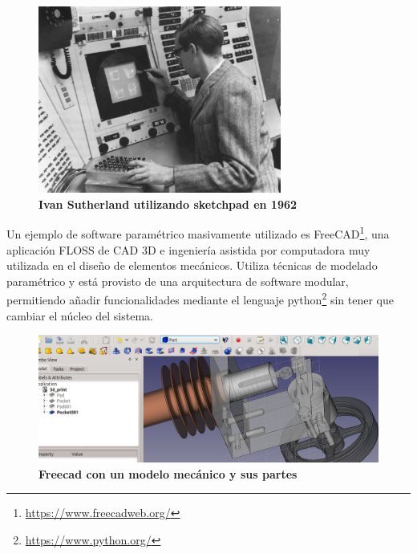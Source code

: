 \begin{figure}[h]
\includegraphics[width=8cm]{Img/GEO/geo-sketchpadc.jpg}
\centering
\caption{\textbf{\footnotesize{Ivan Sutherland utilizando sketchpad en 1962}}}
\end{figure}


Un ejemplo de software paramétrico masivamente utilizado es FreeCAD\footnote{\url{https://www.freecadweb.org/}}, una aplicación FLOSS de CAD 3D e ingeniería asistida por computadora muy utilizada en el diseño de elementos mecánicos. Utiliza técnicas de modelado paramétrico y está provisto de una arquitectura de software modular, permitiendo añadir funcionalidades mediante el lenguaje python\footnote{\url{https://www.python.org/}} sin tener que cambiar el núcleo del sistema.

\begin{figure}[h]
\includegraphics[width=14cm]{Img/CPD/freecad.jpg}
\centering
\caption{\textbf{\footnotesize{Freecad con un modelo mecánico y sus partes}}}
\end{figure}



